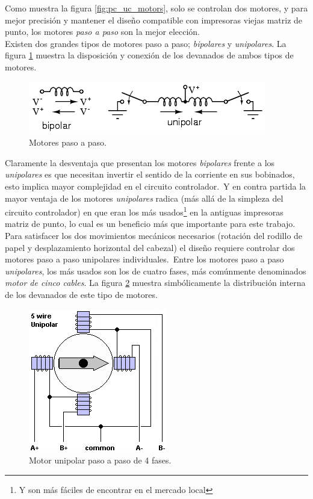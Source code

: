 Como muestra la figura \ref{fig:pc_uc_motors}, solo se controlan dos motores, y
para mejor precisi\'on y mantener el dise\~no compatible con impresoras viejas
matriz de punto, los motores \emph{paso a paso} son la mejor elecci\'on.\\

Existen dos grandes tipos de motores paso a paso; \emph{bipolares} y
\emph{unipolares}. La figura \ref{fig:stepper_motors} muestra la disposici\'on
y conexi\'on de los devanados de ambos tipos de motores. 


\begin{figure}[htp]
\centering
\includegraphics[scale=0.7]{./img/02440.png}
\caption{Motores paso a paso.}
\label{fig:stepper_motors}
\end{figure}

Claramente la desventaja que presentan los motores \emph{bipolares} frente a
los \emph{unipolares} es que necesitan invertir el sentido de la corriente en
sus bobinados, esto implica mayor complejidad en el circuito controlador.\
Y en contra partida la mayor ventaja de los motores \emph{unipolares} radica
(m\'as all\'a de la simpleza del circuito controlador) en que eran los m\'as
usados\footnote{Y son m\'as f\'aciles de encontrar en el mercado local} en la
antiguas impresoras matriz de punto, lo cual es un beneficio m\'as que
importante
para este trabajo.\\

Para satisfacer los dos movimientos mec\'anicos necesarios (rotaci\'on del
rodillo de papel y desplazamiento horizontal del cabezal) el dise\~no requiere
controlar dos motores paso a paso unipolares individuales.\
Entre los motores paso a paso \emph{unipolares}, los m\'as usados son los de
cuatro fases, m\'as com\'unmente denominados \emph{motor de cinco cables}. La
figura \ref{fig:stepper_motor_5_wire} muestra simb\'olicamente la
distribuci\'on interna de los devanados de este tipo de motores.

\begin{figure}[htp]
\centering
\includegraphics[scale=0.5]{./img/5wire.png}
\caption{Motor unipolar paso a paso de 4 fases.}
\label{fig:stepper_motor_5_wire}
\end{figure}

